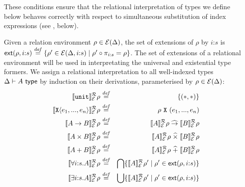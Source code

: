 %
%
\noindent
These conditions ensure that the relational interpretation of types we
define below behaves correctly with respect to simultaneous
substitution of index expressions (see
, below).

%
Given a relation environment $\rho \in \mathcal{E}(\Delta)$, %
the set of extensions %
of $\rho$ by %
$i\mathord:s$ %
is $\mathsf{ext}(\rho,i\mathord:s) \stackrel{\mathit{def}}= \{ \rho' \in
\mathcal{E}(\Delta,i\mathord:s) \mathrel| \rho' \circ \pi_{i\mathord:s} =
\rho \}$. The set of extensions of a relational environment will be
used in interpretating the universal and existential type formers.  We
assign a relational interpretation to all well-indexed types $\Delta
\vdash A \textup{\textsf{ type}}$ by induction on their derivations, parameterised by
$\rho \in \mathcal{E}(\Delta)$:
\begin{eqnarray*}
  \llbracket \texttt{unit} \rrbracket^{\mathcal{R}}_{\mathcal{E}}{\rho} & \stackrel{\mathit{def}}= & \{(*,*)\} \\
  \llbracket \textup{\texttt{X}}\langle e_1,...,e_n \rangle \rrbracket^{\mathcal{R}}_{\mathcal{E}}{\rho} & \stackrel{\mathit{def}}= & \rho\ {\textup{\texttt{X}}}\ (e_1,...,e_n) \\
  \llbracket A \to B \rrbracket^{\mathcal{R}}_{\mathcal{E}}{\rho} & \stackrel{\mathit{def}}= & \llbracket A \rrbracket^{\mathcal{R}}_{\mathcal{E}}{\rho} \mathrel{\widehat\to} \llbracket B \rrbracket^{\mathcal{R}}_{\mathcal{E}}{\rho} \\
  \llbracket A \times B \rrbracket^{\mathcal{R}}_{\mathcal{E}}{\rho} & \stackrel{\mathit{def}}= & \llbracket A \rrbracket^{\mathcal{R}}_{\mathcal{E}}{\rho} \mathrel{\widehat\times} \llbracket B \rrbracket^{\mathcal{R}}_{\mathcal{E}}{\rho} \\
  \llbracket A + B \rrbracket^{\mathcal{R}}_{\mathcal{E}}{\rho} & \stackrel{\mathit{def}}= & \llbracket A \rrbracket^{\mathcal{R}}_{\mathcal{E}}{\rho} \mathrel{\widehat+} \llbracket B \rrbracket^{\mathcal{R}}_{\mathcal{E}}{\rho} \\
  \llbracket \forall i\mathord:s.A \rrbracket^{\mathcal{R}}_{\mathcal{E}}{\rho} & \stackrel{\mathit{def}}= & \bigcap\{ \llbracket A \rrbracket^{\mathcal{R}}_{\mathcal{E}}{\rho'} \mathrel| \rho' \in \mathsf{ext}(\rho,i\mathord:s) \} \\
  \llbracket \exists i\mathord:s.A \rrbracket^{\mathcal{R}}_{\mathcal{E}}{\rho} & \stackrel{\mathit{def}}= & \bigcup\{ \llbracket A \rrbracket^{\mathcal{R}}_{\mathcal{E}}{\rho'} \mathrel| \rho' \in \mathsf{ext}(\rho,i\mathord:s) \}
\end{eqnarray*}
